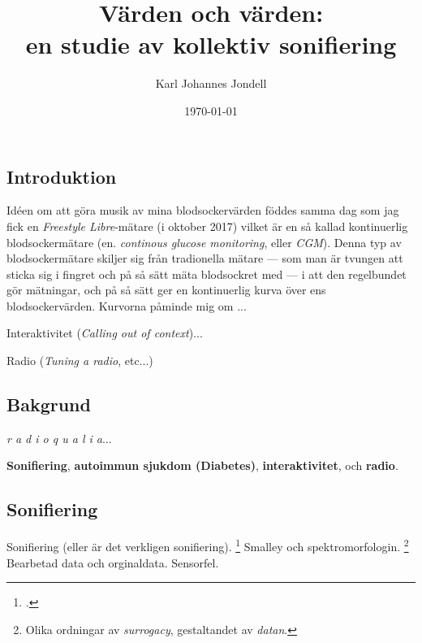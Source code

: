 \documentclass[11pt, twoside, a4paper]{article}
\title{Värden och värden:\\
	\large en studie av kollektiv sonifiering
}
\author{Karl Johannes Jondell}
\date{\today}
\begin{document}



\tableofcontents
\clearpage

\newpage
\begin{multicols}{2}

\section*{Introduktion}

Idéen om att göra musik av mina blodsockervärden föddes samma dag som jag fick en \emph{Freestyle Libre}-mätare (i oktober 2017) vilket är en så kallad kontinuerlig blodsockermätare (en. \emph{continous glucose monitoring}, eller \emph{CGM}). Denna typ av blodsockermätare skiljer sig från tradionella mätare --- som man är tvungen att sticka sig i fingret och på så sätt mäta blodsockret med --- i att den regelbundet gör mätningar, och på så sätt ger en kontinuerlig kurva över ens blodsockervärden. Kurvorna påminde mig om ...

Interaktivitet (\emph{Calling out of context})...

Radio (\emph{Tuning a radio}, etc...)

\subsection*{Bakgrund}
\emph{r a d i o q u a l i a}...

\textbf{Sonifiering}, \textbf{autoimmun sjukdom (Diabetes)}, \textbf{interaktivitet}, och \textbf{radio}.


\subsection*{Sonifiering}
Sonifiering (eller är det verkligen sonifiering). \footcite[2]{bijsterveld_sonic_2019}
Smalley och spektromorfologin. \footnote{Olika ordningar av \emph{surrogacy},  gestaltandet av \emph{datan}.} Bearbetad data och orginaldata. Sensorfel.


\end{multicols}
\end{document}
